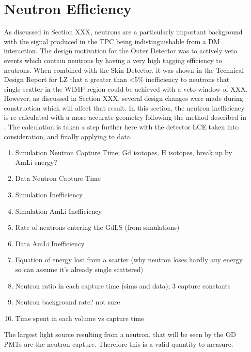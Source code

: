 \section{Neutron Efficiency}
\par
As discussed in Section XXX, neutrons are a particularly important background with the signal produced in the TPC being indistinguishable from a DM interaction.
The design motivation for the Outer Detector was to actively veto events which contain neutrons by having a very high tagging efficiency to neutrons.
When combined with the Skin Detector, it was shown in the Technical Design Report for LZ that a greater than <5\% inefficiency to neutrons that single scatter in the WIMP region could be achieved with a veto window of XXX.
However, as discussed in Section XXX, several design changes were made during construction which will affect that result.
In this section, the neutron inefficiency is re-calculated with a more accurate geometry following the method described in \cite{sallyshaw_thesis_ref}.
The calculation is taken a step further here with the detector LCE taken into consideration, and finally applying to data. 



\begin{tcolorbox}[colback=red!5!white, colframe=red!50!black, title=Key Plots]
\begin{enumerate}
    \item Simulation Neutron Capture Time; Gd isotopes, H isotopes, break up by AmLi energy?
    \item Data Neutron Capture Time
    \item Simulation Inefficiency
    \item Simulation AmLi Inefficiency
    \item Rate of neutrons entering the GdLS (from simulations)
    \item Data AmLi Inefficiency
    \item Equation of energy lost from a scatter (why neutron loses hardly any energy so can assume it's already single scattered)
    \item Neutron ratio in each capture time (sims and data); 3 capture constants
    \item Neutron background rate? not sure
    \item Time spent in each volume vs capture time
\end{enumerate}
\end{tcolorbox}

\par
The largest light source resulting from a neutron, that will be seen by the OD PMTs are the neutron capture.
Therefore this is a valid quantity to measure.


